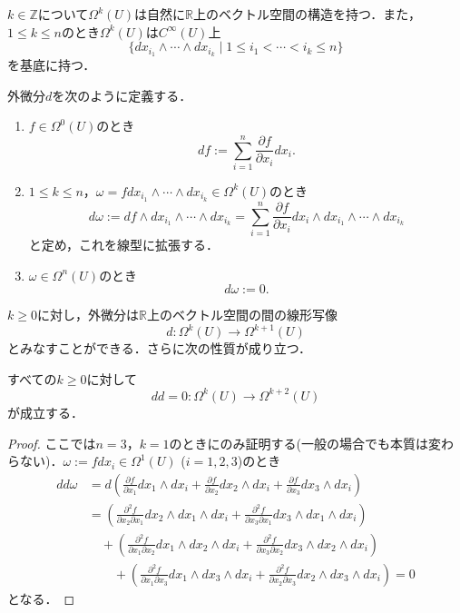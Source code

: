 \documentclass[uplatex]{jsarticle}
\begin{document}
$k\in\mathbb{Z}$について$\Omega^k(U)$は自然に$\mathbb{R}$上のベクトル空間の構造を持つ．また，$1\le k \le n$のとき$\Omega^k(U)$は$C^{\infty}(U)$上
\[ \{dx_{i_1}\wedge\cdots\wedge dx_{i_k}\mid 1\le i_1<\cdots<i_k\le n \} \]
を基底に持つ．
\begin{definition}[外微分]
外微分$d$を次のように定義する．
\begin{enumerate}[label=(\arabic*)]
\item $f\in\Omega ^0(U)$のとき
\[ df:=\sum_{i=1}^n \frac{\partial f}{\partial x_i}dx_i . \]
\item $1\le k\le n$，$\omega=fdx_{i_1}\wedge\cdots\wedge dx_{i_k}\in\Omega^k(U)$のとき
\[ d\omega:=df\wedge dx_{i_1}\wedge\cdots\wedge dx_{i_k}=\sum^n_{i=1}\frac{\partial f}{\partial x_i}dx_i\wedge dx_{i_1}\wedge\cdots\wedge dx_{i_k} \]
と定め，これを線型に拡張する．
\item $\omega\in\Omega^n(U)$のとき
\[ d\omega :=0. \]
\end{enumerate}
\end{definition}
$k\ge 0$に対し，外微分は$\mathbb{R}$上のベクトル空間の間の線形写像
\[ d\colon \Omega^k(U)\rightarrow\Omega^{k+1}(U) \]
とみなすことができる．さらに次の性質が成り立つ．
\begin{proposition}\label{prop1}
すべての$k\geq 0$に対して
\[ dd=0\colon \Omega^k(U)\rightarrow\Omega^{k+2}(U) \]
が成立する．
\end{proposition}
\begin{proof}
ここでは$n=3$，$k=1$のときにのみ証明する(一般の場合でも本質は変わらない)．$\omega:=fdx_i\in\Omega^1(U)$ ($i=1,2,3$)のとき
\begin{align*}
dd\omega &= d\left(\frac{\partial f}{\partial x_1}dx_1\wedge dx_i+\frac{\partial f}{\partial x_2}dx_2\wedge dx_i+\frac{\partial f}{\partial x_3}dx_3\wedge dx_i\right)   \\
&= \left(\frac{\partial^2 f}{\partial x_2 \partial x_1}dx_2\wedge dx_1\wedge dx_i+\frac{\partial^2 f}{\partial x_3\partial x_1}dx_3\wedge dx_1\wedge dx_i\right)  \\
&\quad + \left(\frac{\partial^2 f}{\partial x_1\partial x_2}dx_1\wedge dx_2\wedge dx_i+\frac{\partial^2 f}{\partial x_3\partial x_2}dx_3\wedge dx_2\wedge dx_i\right)  \\
&\qquad +\left(\frac{\partial^2 f}{\partial x_1\partial x_3}dx_1\wedge dx_3\wedge dx_i+\frac{\partial^2 f}{\partial x_2 \partial x_3}dx_2\wedge dx_3\wedge dx_i\right)   =0 
\end{align*}
となる．
\end{proof}
\end{document}
